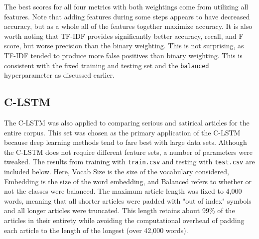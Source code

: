 \documentclass [12 pt] {report}
\begin{document}
The best scores for all four metrics with both weightings come from utilizing all features. Note that adding features during some steps appears to have decreased accuracy, but as a whole all of the features together maximize accuracy. It is also worth noting that TF-IDF provides significantly better accuracy, recall, and F score, but worse precision than the binary weighting. This is not surprising, as TF-IDF tended to produce more false positives than binary weighting. This is consistent with the fixed training and testing set and the \texttt{balanced} hyperparameter as discussed earlier.

\subsection{C-LSTM}
The C-LSTM was also applied to comparing serious and satirical articles for the entire corpus. This set was chosen as the primary application of the C-LSTM because deep learning methods tend to fare best with large data sets. Although the C-LSTM does not require different feature sets, a number of parameters were tweaked. The results from training with \texttt{train.csv} and testing with \texttt{test.csv} are included below. Here, Vocab Size is the size of the vocabulary considered, Embedding is the size of the word embedding, and Balanced refers to whether or not the classes were balanced. The maximum article length was fixed to 4,000 words, meaning that all shorter articles were padded with "out of index" symbols and all longer articles were truncated. This length retains about 99\% of the articles in their entirety while avoiding the computational overhead of padding each article to the length of the longest (over 42,000 words).

\vspace*{-2mm}
\begin{table}[H]
\small
{}
\label{table:C-LSTM Results}
\end{table}
\end{document}

